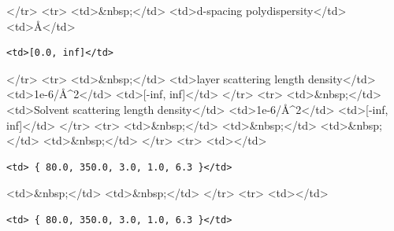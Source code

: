 \textless{}/tr\textgreater{} \textless{}tr\textgreater{} \textless{}td\textgreater{}\&nbsp;\textless{}/td\textgreater{} \textless{}td\textgreater{}d-spacing polydispersity\textless{}/td\textgreater{} \textless{}td\textgreater{}\AA{}\textless{}/td\textgreater{}

\begin{verbatim}
<td>[0.0, inf]</td>
\end{verbatim}

\textless{}/tr\textgreater{} \textless{}tr\textgreater{} \textless{}td\textgreater{}\&nbsp;\textless{}/td\textgreater{} \textless{}td\textgreater{}layer scattering length density\textless{}/td\textgreater{} \textless{}td\textgreater{}1e-6/\AA{}\textasciicircum{}2\textless{}/td\textgreater{} \textless{}td\textgreater{}[-inf, inf]\textless{}/td\textgreater{} \textless{}/tr\textgreater{} \textless{}tr\textgreater{} \textless{}td\textgreater{}\&nbsp;\textless{}/td\textgreater{} \textless{}td\textgreater{}Solvent scattering length density\textless{}/td\textgreater{} \textless{}td\textgreater{}1e-6/\AA{}\textasciicircum{}2\textless{}/td\textgreater{} \textless{}td\textgreater{}[-inf, inf]\textless{}/td\textgreater{} \textless{}/tr\textgreater{} \textless{}tr\textgreater{} \textless{}td\textgreater{}\&nbsp;\textless{}/td\textgreater{} \textless{}td\textgreater{}\&nbsp;\textless{}/td\textgreater{} \textless{}td\textgreater{}\&nbsp;\textless{}/td\textgreater{} \textless{}td\textgreater{}\&nbsp;\textless{}/td\textgreater{} \textless{}/tr\textgreater{} \textless{}tr\textgreater{} \textless{}td\textgreater{}\textless{}/td\textgreater{}

\begin{verbatim}
<td> { 80.0, 350.0, 3.0, 1.0, 6.3 }</td>
\end{verbatim}

\textless{}td\textgreater{}\&nbsp;\textless{}/td\textgreater{} \textless{}td\textgreater{}\&nbsp;\textless{}/td\textgreater{} \textless{}/tr\textgreater{} \textless{}tr\textgreater{} \textless{}td\textgreater{}\textless{}/td\textgreater{}

\begin{verbatim}
<td> { 80.0, 350.0, 3.0, 1.0, 6.3 }</td>
\end{verbatim}

